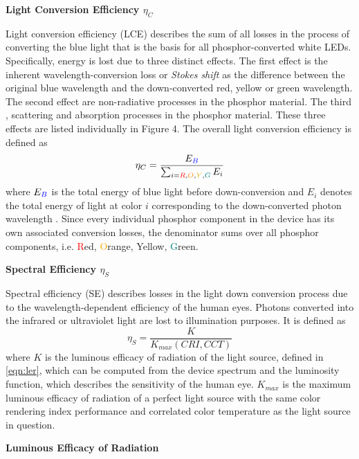 \documentclass[parskip=full]{article}
\begin{document}
\textbf{Light Conversion Efficiency $\eta_{C}$}

Light conversion efficiency (LCE) describes the sum of all losses in the process of converting the blue light that is the basis for all phosphor-converted white LEDs. Specifically, energy is lost due to three distinct effects. The first effect is the inherent wavelength-conversion loss or \textit{Stokes shift} as the difference between the original blue wavelength and the down-converted red, yellow or green wavelength. The second effect are non-radiative processes in the phosphor material. The third , scattering and absorption processes in the phosphor material. These three effects are listed individually in Figure 4. The overall light conversion efficiency is defined as
%
\begin{equation}
    \eta_{C} = \frac{E_{\textcolor{blue}{B}}}{\sum_{i=\textcolor{red}{R},\textcolor{orange}{O},\textcolor[RGB]{225, 180, 0}{Y},\textcolor{teal}{G}} E_i}
\end{equation}
%
where $E_{\textcolor{blue}{B}}$ is the total energy of blue light before down-conversion and $E_i$ denotes the total energy of light at color $i$ corresponding to the down-converted photon wavelength \cite{schubert2018light}\cite{tsao2010solid}. Since every individual phosphor component in the device has its own associated conversion losses, the denominator sums over all phosphor components, i.e. \textcolor{red}{R}ed, \textcolor{orange}{O}range, \textcolor[RGB]{225, 180, 0}{Y}ellow, \textcolor{teal}{G}reen.

\textbf{Spectral Efficiency $\eta_{S}$}

Spectral efficiency (SE) describes losses in the light down conversion process due to the wavelength-dependent efficiency of the human eyes. Photons converted into the infrared or ultraviolet light are lost to illumination purposes. It is defined as
%
\begin{equation}
    \eta_{S} = \frac{K}{K_{max}(CRI,CCT)}
\end{equation}
%
where $K$ is the luminous efficacy of radiation of the light source, defined in \cref{eqn:ler}, which can be computed from the device spectrum and the luminosity function, which describes the sensitivity of the human eye. $K_{max}$ is the maximum luminous efficacy of radiation of a perfect light source with the same color rendering index performance and correlated color temperature as the light source in question\cite{schubert2018light}\cite{tsao2010solid}.

\textbf{Luminous Efficacy of Radiation}
\label{subsec:ler}
\end{document}
